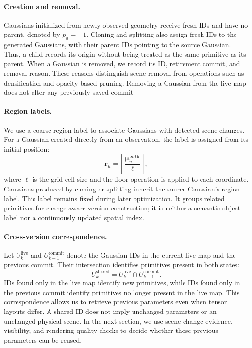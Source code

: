 \paragraph{Creation and removal.}
Gaussians initialized from newly observed geometry receive fresh IDs
and have no parent, denoted by $p_u=-1$.
Cloning and splitting also assign fresh IDs to the generated Gaussians,
with their parent IDs pointing to the source Gaussian.
Thus, a child records its origin without being treated as the same
primitive as its parent.
When a Gaussian is removed, we record its ID, retirement commit,
and removal reason.
These reasons distinguish scene removal from operations such as
densification and opacity-based pruning.
Removing a Gaussian from the live map does not alter any previously
saved commit.

\paragraph{Region labels.}
We use a coarse region label to associate Gaussians with detected
scene changes.
For a Gaussian created directly from an observation, the label is
assigned from its initial position:
\begin{equation}
    \boldsymbol{r}_u =
    \left\lfloor
    \frac{\boldsymbol{\mu}_u^{\mathrm{birth}}}{\ell}
    \right\rfloor,
\end{equation}
where $\ell$ is the grid cell size and the floor operation is applied
to each coordinate.
Gaussians produced by cloning or splitting inherit the source
Gaussian's region label.
This label remains fixed during later optimization.
It groups related primitives for change-aware version construction;
it is neither a semantic object label nor a continuously updated
spatial index.

\paragraph{Cross-version correspondence.}
Let $U_k^{\mathrm{live}}$ and $U_{k-1}^{\mathrm{commit}}$ denote the
Gaussian IDs in the current live map and the previous commit.
Their intersection identifies primitives present in both states:
\begin{equation}
    U_k^{\mathrm{shared}}
    =
    U_k^{\mathrm{live}}
    \cap U_{k-1}^{\mathrm{commit}}.
\end{equation}
IDs found only in the live map identify new primitives, while IDs
found only in the previous commit identify primitives no longer
present in the live map.
This correspondence allows us to retrieve previous parameters
even when tensor layouts differ.
A shared ID does not imply unchanged parameters or an unchanged
physical scene.
In the next section, we use scene-change evidence, visibility,
and rendering-quality checks to decide whether those previous
parameters can be reused.


